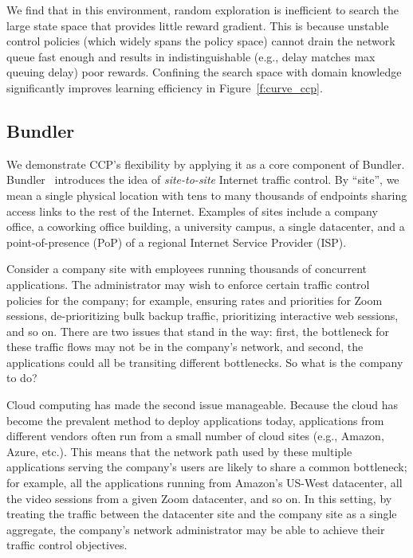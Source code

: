 We find that in this environment, random exploration is inefficient
to search the large state space that provides little reward gradient.
This is because unstable control policies (which widely spans the policy space)
cannot drain the network queue fast enough and results in indistinguishable
(e.g., delay matches max queuing delay) poor rewards.
Confining the search space with domain knowledge significantly improves
learning efficiency in Figure~\ref{f:curve_ccp}.

\subsection{Bundler}\label{s:capabilities:bundler}
\newcommand{\bundle}{bundle\xspace}
\newcommand{\inbox}{sendbox\xspace}
\newcommand{\outbox}{receivebox\xspace}
\newcommand{\capinbox}{Sendbox\xspace}
\newcommand{\capoutbox}{Receivebox\xspace}
\newcommand{\pair}{\inbox-\outbox pair\xspace}

We demonstrate CCP's flexibility by applying it as a core component of Bundler.
Bundler~\cite{bundler} introduces the idea of {\em site-to-site} Internet traffic control. By ``site'', we mean a single physical location with tens to many thousands of endpoints sharing access links to the rest of the Internet. Examples of sites include a company office, a coworking office building, a university campus, a single datacenter, and a point-of-presence (PoP) of a regional Internet Service Provider (ISP). 

Consider a company site with employees running thousands of concurrent applications. The administrator may wish to enforce certain traffic control policies for the company; for example, ensuring rates and priorities for Zoom sessions, de-prioritizing bulk backup traffic, prioritizing interactive web sessions, and so on. There are two issues that stand in the way: first, the bottleneck for these traffic flows may not be in the company's network, and second, the applications could all be transiting different bottlenecks. So what is the company to do?

Cloud computing has made the second issue manageable. Because the cloud has become the prevalent method to deploy applications today, applications from different vendors often run from a small number of cloud sites (e.g., Amazon, Azure, etc.). This means that the network path used by these multiple applications serving the company's users are likely to share a common bottleneck; for example, all the applications running from Amazon's US-West datacenter, all the video sessions from a given Zoom datacenter, and so on. In this setting,  by treating the traffic between the datacenter site and the company site as a single aggregate, the company's network administrator may be able to achieve their traffic control objectives.

